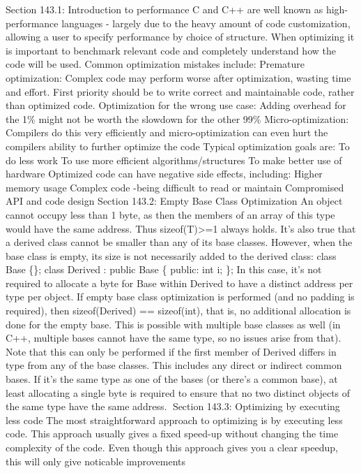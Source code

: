 Section 143.1: Introduction to performance C and C++ are well known as
high-performance languages - largely due to the heavy amount of code
customization, allowing a user to specify performance by choice of
structure. When optimizing it is important to benchmark relevant code
and completely understand how the code will be used. Common optimization
mistakes include: Premature optimization: Complex code may perform worse
after optimization, wasting time and eﬀort. First priority should be to
write correct and maintainable code, rather than optimized code.
Optimization for the wrong use case: Adding overhead for the 1\% might
not be worth the slowdown for the other 99\% Micro-optimization:
Compilers do this very eﬃciently and micro-optimization can even hurt
the compilers ability to further optimize the code Typical optimization
goals are: To do less work To use more eﬃcient algorithms/structures To
make better use of hardware Optimized code can have negative side
eﬀects, including: Higher memory usage Complex code -being diﬃcult to
read or maintain Compromised API and code design Section 143.2: Empty
Base Class Optimization An object cannot occupy less than 1 byte, as
then the members of an array of this type would have the same address.
Thus sizeof(T)\textgreater=1 always holds. It's also true that a derived
class cannot be smaller than any of its base classes. However, when the
base class is empty, its size is not necessarily added to the derived
class: class Base \{\}; class Derived : public Base \{ public: int i;
\}; In this case, it's not required to allocate a byte for Base within
Derived to have a distinct address per type per object. If empty base
class optimization is performed (and no padding is required), then
sizeof(Derived) == sizeof(int), that is, no additional allocation is
done for the empty base. This is possible with multiple base classes as
well (in C++, multiple bases cannot have the same type, so no issues
arise from that). Note that this can only be performed if the ﬁrst
member of Derived diﬀers in type from any of the base classes. This
includes any direct or indirect common bases. If it's the same type as
one of the bases (or there's a common base), at least allocating a
single byte is required to ensure that no two distinct objects of the
same type have the same address. Section 143.3: Optimizing by executing
less code The most straightforward approach to optimizing is by
executing less code. This approach usually gives a ﬁxed speed-up without
changing the time complexity of the code. Even though this approach
gives you a clear speedup, this will only give noticable improvements

